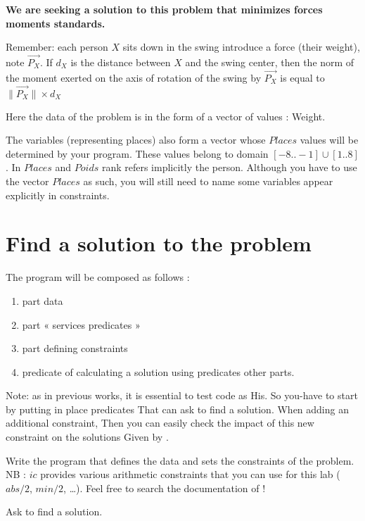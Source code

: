 \textbf{We are seeking a solution to this problem that minimizes forces moments standards.}

\newpage
Remember: each person $X$ sits down in the swing introduce a force (their weight), note $\overrightarrow{P_X}$. If $d_X$ is the distance between $X$ 
and the swing center, then the norm of the moment exerted on the axis of rotation of the swing by $\overrightarrow{P_X}$ is equal to  $\| \overrightarrow{P_X}\| \times d_X$ 

Here the data of the problem is in the form of a vector of values
: Weight.

The variables (representing places) also form a vector whose $Places$
values will be determined by your program. These values belong to
domain $[-8..-1] \cup [1..8]$. In $Places$ and $Poids$ rank refers implicitly
the person. Although you have to use the vector $Places$ as such, you
will still need to name some variables appear explicitly
in constraints.

\section{Find a solution to the problem}


\noindent The program will be composed as follows :

\begin{enumerate}
\item part data
\item part « services predicates »
\item part defining constraints
\item predicate of calculating a solution using predicates other parts.
\end{enumerate}

Note: as in previous works, it is essential to test code as His. So you-have to start by putting in place predicates That can ask \eclipse{} to find a solution.
When adding an additional constraint, Then you can easily check the impact of this new constraint on the solutions Given by \eclipse{}.

\begin{question}
Write the program that defines the data and sets the constraints of the problem. NB : $ic$ provides various arithmetic constraints that you can use for this lab ($abs/2$, $min/2$, \ldots). Feel free to search the documentation of \eclipse{}!
\end{question}

\begin{question} \label{TP3_Qfin}
Ask \eclipse{} to find a solution.
\end{question}


